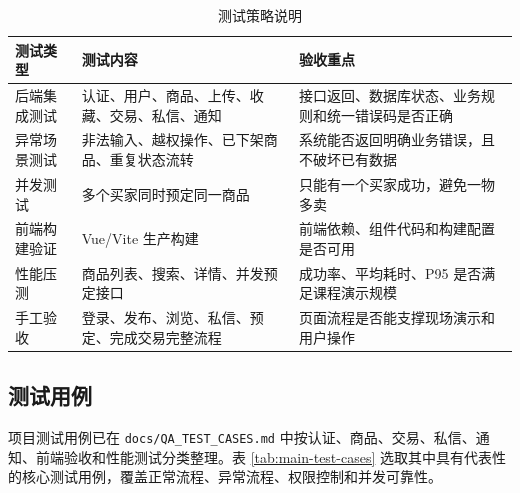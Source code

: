 ﻿\documentclass[UTF8,a4paper,12pt]{ctexart}
\begin{document}
\begin{table}[H]
  \centering
  \caption{测试策略说明}
  \begin{tabular}{p{3cm}p{5.2cm}p{5.5cm}}
    \toprule
    测试类型 & 测试内容 & 验收重点 \\
    \midrule
    后端集成测试 & 认证、用户、商品、上传、收藏、交易、私信、通知 & 接口返回、数据库状态、业务规则和统一错误码是否正确 \\
    异常场景测试 & 非法输入、越权操作、已下架商品、重复状态流转 & 系统能否返回明确业务错误，且不破坏已有数据 \\
    并发测试 & 多个买家同时预定同一商品 & 只能有一个买家成功，避免一物多卖 \\
    前端构建验证 & Vue/Vite 生产构建 & 前端依赖、组件代码和构建配置是否可用 \\
    性能压测 & 商品列表、搜索、详情、并发预定接口 & 成功率、平均耗时、P95 是否满足课程演示规模 \\
    手工验收 & 登录、发布、浏览、私信、预定、完成交易完整流程 & 页面流程是否能支撑现场演示和用户操作 \\
    \bottomrule
  \end{tabular}
\end{table}

\subsection{测试用例}
项目测试用例已在 \texttt{docs/QA\_TEST\_CASES.md} 中按认证、商品、交易、私信、通知、前端验收和性能测试分类整理。表 \ref{tab:main-test-cases} 选取其中具有代表性的核心测试用例，覆盖正常流程、异常流程、权限控制和并发可靠性。
\end{document}
